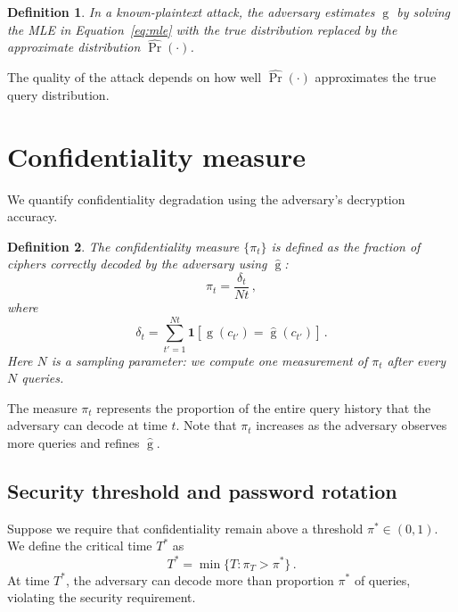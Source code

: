 \documentclass[final,11pt]{article}
\theoremstyle{plain}
\newtheorem{definition}{Definition}
\theoremstyle{remark}
\begin{document}
\begin{definition}
In a \emph{known-plaintext attack}, the adversary estimates
$\operatorname{g}$ by solving the MLE in Equation~\eqref{eq:mle} with
the true distribution replaced by the approximate distribution
$\hat{\Pr}(\cdot)$.
\end{definition}

The quality of the attack depends on how well $\hat{\Pr}(\cdot)$ approximates
the true query distribution.

\section{Confidentiality measure}

We quantify confidentiality degradation using the adversary's decryption
accuracy.

\begin{definition}
The confidentiality measure $\{\pi_t\}$ is defined as the fraction of
ciphers correctly decoded by the adversary using $\hat{\operatorname{g}}$:
\begin{equation}
\label{eq:accuracy}
    \pi_t = \frac{\delta_t}{Nt}\,,
\end{equation}
where
\begin{equation}
    \delta_t = \sum_{t'=1}^{Nt} \mathbf{1}[\operatorname{g}(c_{t'}) = \hat{\operatorname{g}}(c_{t'})]\,.
\end{equation}
Here $N$ is a sampling parameter: we compute one measurement of $\pi_t$
after every $N$ queries.
\end{definition}

The measure $\pi_t$ represents the proportion of the entire query history
that the adversary can decode at time $t$. Note that $\pi_t$ increases as
the adversary observes more queries and refines $\hat{\operatorname{g}}$.

\subsection{Security threshold and password rotation}

Suppose we require that confidentiality remain above a threshold $\pi^* \in (0,1)$.
We define the critical time $T^*$ as
\begin{equation}
  T^* = \min\{T : \pi_T > \pi^*\}\,.
\end{equation}
At time $T^*$, the adversary can decode more than proportion $\pi^*$ of
queries, violating the security requirement.
\end{document}
